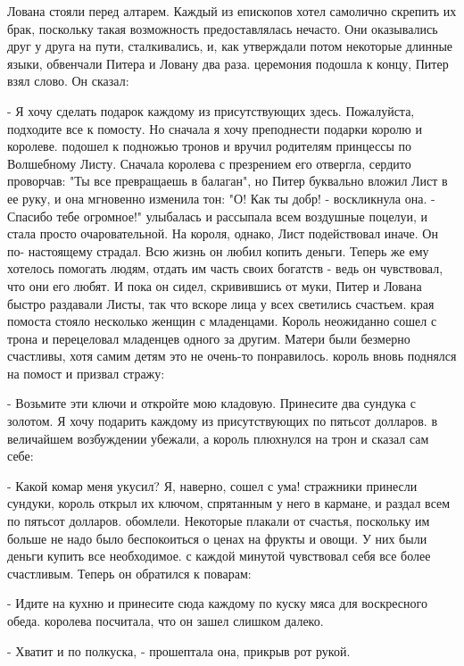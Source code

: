 Лована стояли перед алтарем. Каждый из епископов хотел самолично 
скрепить их брак, поскольку такая возможность предоставлялась нечасто. 
Они оказывались друг у друга на пути, сталкивались, и, как утверждали 
потом некоторые длинные языки, обвенчали Питера и Ловану два раза.
 церемония подошла к концу, Питер взял слово. Он сказал:
\par- Я хочу сделать подарок каждому из присутствующих здесь. 
Пожалуйста, подходите все к помосту. Но сначала я хочу преподнести 
подарки королю и королеве.
 подошел к подножью тронов и вручил родителям принцессы по 
Волшебному Листу. Сначала королева с презрением его отвергла, сердито 
проворчав: "Ты все превращаешь в балаган", но Питер буквально вложил 
Лист в ее руку, и она мгновенно изменила тон: "О! Как ты добр! - 
воскликнула она. - Спасибо тебе огромное!"
 улыбалась и рассыпала всем воздушные поцелуи, и стала просто 
очаровательной. На короля, однако, Лист подействовал иначе. Он по-
настоящему страдал. Всю жизнь он любил копить деньги. Теперь же ему 
хотелось помогать людям, отдать им часть своих богатств - ведь он 
чувствовал, что они его любят. И пока он сидел, скривившись от муки, 
Питер и Лована быстро раздавали Листы, так что вскоре лица у всех 
светились счастьем.
 края помоста стояло несколько женщин с младенцами. Король 
неожиданно сошел с трона и перецеловал младенцев одного за другим. 
Матери были безмерно счастливы, хотя самим детям это не очень-то 
понравилось.
 король вновь поднялся на помост и призвал стражу:
\par- Возьмите эти ключи и откройте мою кладовую. Принесите два 
сундука с золотом. Я хочу подарить каждому из присутствующих по 
пятьсот долларов.
 в величайшем возбуждении убежали, а король плюхнулся на 
трон и сказал сам себе:
\par- Какой комар меня укусил? Я, наверно, сошел с ума!
 стражники принесли сундуки, король открыл их ключом, 
спрятанным у него в кармане, и раздал всем по пятьсот долларов.
 обомлели. Некоторые плакали от счастья, поскольку им 
больше не надо было беспокоиться о ценах на фрукты и овощи. У них были 
деньги купить все необходимое.
 с каждой минутой чувствовал себя все более счастливым. 
Теперь он обратился к поварам:
\par- Идите на кухню и принесите сюда каждому по куску мяса для 
воскресного обеда.
 королева посчитала, что он зашел слишком далеко.
\par- Хватит и по полкуска, - прошептала она, прикрыв рот рукой.
